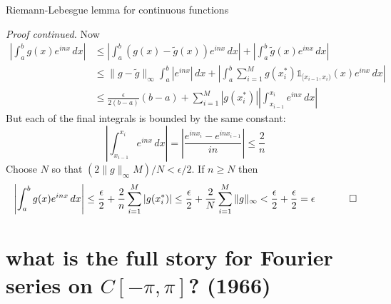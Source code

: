 \documentclass[10pt,
               svgnames,
               hyperref={colorlinks,
                         citecolor=DeepPink4,
                         linkcolor=FireBrick,
                         urlcolor=blue},
               usepdftitle=false]{beamer}
\newcommand{\one}{\mathds{1}}
\newcommand{\eps}{\epsilon}
\begin{document}
\begin{frame}{Riemann-Lebesgue lemma for continuous functions}

{\small
\noindent \emph{Proof continued.}  Now
\begin{align*}
\left|\int_a^b g(x) e^{inx}\,dx\right| &\le \left|\int_a^b (g(x) - \tilde g(x)) e^{inx}\,dx\right| + \left|\int_a^b \tilde g(x) e^{inx}\,dx\right| \\
&\le \|g-\tilde g\|_\infty \int_a^b |e^{inx}|\,dx + \left|\int_a^b \sum_{i=1}^M g(x_i^*) \one_{[x_{i-1},x_i)}(x) e^{inx}\,dx\right| \\
&\le \frac{\eps}{2(b-a)}(b-a) + \sum_{i=1}^M |g(x_i^*)| \left|\int_{x_{i-1}}^{x_i} e^{inx}\,dx\right|
\end{align*}
But each of the final integrals is bounded by the same constant:
    $$\left|\int_{x_{i-1}}^{x_i} e^{inx}\,dx\right| = \left|\frac{e^{i n x_i} - e^{i n x_{i-1}}}{in}\right| \le \frac{2}{n}$$
Choose $N$ so that $(2\|g\|_\infty M)/N < \eps/2$.  If $n\ge N$ then
  $$\left|\int_a^b g(x) e^{inx}\,dx\right| \le \frac{\eps}{2} + \frac{2}{n} \sum_{i=1}^M |g(x_i^*)| \le \frac{\eps}{2} + \frac{2}{N} \sum_{i=1}^M \|g\|_\infty < \frac{\eps}{2} +  \frac{\eps}{2} = \eps \hspace{5mm} \qed$$
}
\end{frame}


\section{what is the full story for Fourier series on $C[-\pi,\pi]$? (1966)}
\end{document}

